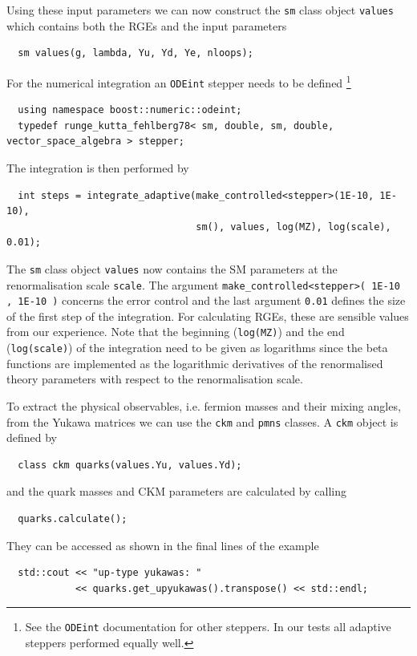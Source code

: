 \documentclass[preprint,12pt]{elsarticle}
\begin{document}
Using these input parameters we can now construct the \texttt{sm} class object \texttt{values} which contains both the RGEs and the input parameters
\begin{lstlisting}
  sm values(g, lambda, Yu, Yd, Ye, nloops);
\end{lstlisting}
For the numerical integration an \texttt{ODEint} stepper needs to be defined \footnote{See the \texttt{ODEint} documentation for other steppers. In our tests all adaptive steppers performed equally well.}
\begin{lstlisting}
  using namespace boost::numeric::odeint;
  typedef runge_kutta_fehlberg78< sm, double, sm, double, vector_space_algebra > stepper;
\end{lstlisting}
The integration is then performed by
\begin{lstlisting}
  int steps = integrate_adaptive(make_controlled<stepper>(1E-10, 1E-10),
                                 sm(), values, log(MZ), log(scale), 0.01);
\end{lstlisting}
The \texttt{sm} class object \texttt{values} now contains the SM parameters at the renormalisation scale \texttt{scale}. The argument \texttt{make\_controlled<stepper>( 1E-10 , 1E-10 )} concerns the error control
and the last argument \texttt{0.01} defines the size of the first step of the integration. For calculating RGEs, these are sensible values from our experience.
Note that the beginning (\texttt{log(MZ)}) and the end (\texttt{log(scale)}) of the integration need to be given as logarithms since the beta functions are implemented as the logarithmic derivatives of the
renormalised theory parameters with respect to the renormalisation scale.

To extract the physical observables, i.e. fermion masses and their mixing angles,  from the Yukawa matrices we can use the \texttt{ckm} and \texttt{pmns} classes. A \texttt{ckm} object is defined by
\begin{lstlisting}
  class ckm quarks(values.Yu, values.Yd);
\end{lstlisting}
and the quark masses and CKM parameters are calculated by calling
\begin{lstlisting}
  quarks.calculate();
\end{lstlisting}
They can be accessed as shown in the final lines of the example
\begin{lstlisting}
  std::cout << "up-type yukawas: "
            << quarks.get_upyukawas().transpose() << std::endl;
\end{lstlisting}
\end{document}
